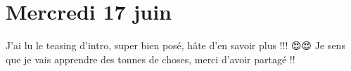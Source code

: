 \section*{Mercredi 17 juin}

\begin{rightbubbles}
J'ai lu le teasing d'intro, super bien posé, hâte d'en savoir plus !!! 😍😍  Je sens que je vais apprendre des tonnes de choses, merci d'avoir partagé !!\\
\end{rightbubbles}